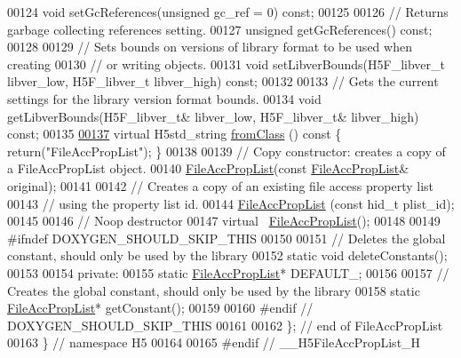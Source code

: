 \begin{DoxyCode}
00124         \textcolor{keywordtype}{void} setGcReferences(\textcolor{keywordtype}{unsigned} gc\_ref = 0) \textcolor{keyword}{const};
00125 
00126         \textcolor{comment}{// Returns garbage collecting references setting.}
00127         \textcolor{keywordtype}{unsigned} getGcReferences() \textcolor{keyword}{const};
00128 
00129         \textcolor{comment}{// Sets bounds on versions of library format to be used when creating}
00130         \textcolor{comment}{// or writing objects.}
00131         \textcolor{keywordtype}{void} setLibverBounds(H5F\_libver\_t libver\_low, H5F\_libver\_t libver\_high) \textcolor{keyword}{const};
00132 
00133         \textcolor{comment}{// Gets the current settings for the library version format bounds.}
00134         \textcolor{keywordtype}{void} getLibverBounds(H5F\_libver\_t& libver\_low, H5F\_libver\_t& libver\_high) \textcolor{keyword}{const};
00135 
\hyperlink{class_h5_1_1_file_acc_prop_list_a91008d21823c623382ab9c6e6640f67d}{00137}         \textcolor{keyword}{virtual} H5std\_string \hyperlink{class_h5_1_1_file_acc_prop_list_a91008d21823c623382ab9c6e6640f67d}{fromClass} ()\textcolor{keyword}{ const }\{ \textcolor{keywordflow}{return}(\textcolor{stringliteral}{"FileAccPropList"}); \}
00138 
00139         \textcolor{comment}{// Copy constructor: creates a copy of a FileAccPropList object.}
00140         \hyperlink{class_h5_1_1_file_acc_prop_list}{FileAccPropList}(\textcolor{keyword}{const} \hyperlink{class_h5_1_1_file_acc_prop_list}{FileAccPropList}& original);
00141 
00142         \textcolor{comment}{// Creates a copy of an existing file access property list}
00143         \textcolor{comment}{// using the property list id.}
00144         \hyperlink{class_h5_1_1_file_acc_prop_list}{FileAccPropList} (\textcolor{keyword}{const} hid\_t plist\_id);
00145 
00146         \textcolor{comment}{// Noop destructor}
00147         \textcolor{keyword}{virtual} ~\hyperlink{class_h5_1_1_file_acc_prop_list}{FileAccPropList}();
00148 
00149 \textcolor{preprocessor}{#ifndef DOXYGEN\_SHOULD\_SKIP\_THIS}
00150 
00151         \textcolor{comment}{// Deletes the global constant, should only be used by the library}
00152         \textcolor{keyword}{static} \textcolor{keywordtype}{void} deleteConstants();
00153 
00154     \textcolor{keyword}{private}:
00155         \textcolor{keyword}{static} \hyperlink{class_h5_1_1_file_acc_prop_list}{FileAccPropList}* DEFAULT\_;
00156 
00157         \textcolor{comment}{// Creates the global constant, should only be used by the library}
00158         \textcolor{keyword}{static} \hyperlink{class_h5_1_1_file_acc_prop_list}{FileAccPropList}* getConstant();
00159 
00160 \textcolor{preprocessor}{#endif // DOXYGEN\_SHOULD\_SKIP\_THIS}
00161 
00162 \}; \textcolor{comment}{// end of FileAccPropList}
00163 \} \textcolor{comment}{// namespace H5}
00164 
00165 \textcolor{preprocessor}{#endif // \_\_H5FileAccPropList\_H}
\end{DoxyCode}
